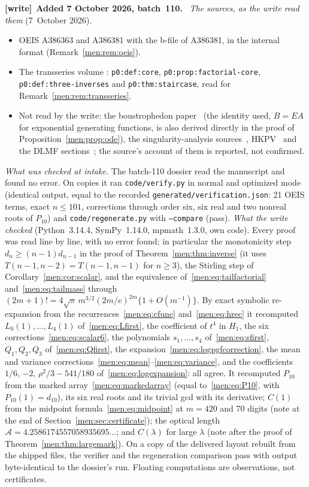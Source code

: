 \documentclass[11pt,letterpaper]{article}
\theoremstyle{remark}\newtheorem{remark}[theorem]{Remark}
\newcommand{\file}[1]{\nolinkurl{#1}}
\newenvironment{writenote}[1][]{\par\smallskip\begingroup\small
 \noindent\textbf{[write]}\if\relax\detokenize{#1}\relax\else~\textbf{#1.}\fi\ }%
 {\par\endgroup\smallskip}
\begin{document}
\begin{writenote}[Added 7 October 2026, batch~110]
\emph{The sources, as the write read them} (7~October 2026).
\begin{itemize}\raggedright
\item OEIS A386363 and A386381 with the b-file of A386381, in the internal
 format (Remark~\ref{men:rem:oeis}).
\item The transseries volume
 :
 \file{p0:def:core}, \file{p0:prop:factorial-core},
 \file{p0:def:three-inverses} and \file{p0:thm:staircase}, read for
 Remark~\ref{men:rem:transseries}.
\item Not read by the write: the boustrophedon paper~\cite{msy} (the
 identity used, $B=EA$ for exponential generating functions, is also
 derived directly in the proof of Proposition~\ref{men:prop:ode}), the
 singularity-analysis sources~\cite{fo,fs}, HKPV~\cite{hkpv} and the DLMF
 sections~\cite{dlmf}; the source's account of them is reported, not
 confirmed.
\end{itemize}

\emph{What was checked at intake.} The batch-110 dossier read the
manuscript and found no error. On copies it ran \file{code/verify.py} in
normal and optimized mode (identical output, equal to the recorded
\file{generated/verification.json}: 21 OEIS terms, exact $n\le101$,
corrections through order six, six real and two nonreal roots of
$P_{10}$) and \file{code/regenerate.py} with \texttt{--compare} (pass).
\emph{What the write checked} (Python~3.14.4, SymPy~1.14.0,
mpmath~1.3.0, own code). Every proof was read line by line, with no error
found; in particular the monotonicity step $d_n\ge(n-1)d_{n-1}$ in the
proof of Theorem~\ref{men:thm:inverse} (it uses $T(n-1,n-2)=T(n-1,n-1)$
for $n\ge3$), the Stirling step of Corollary~\ref{men:cor:scalar}, and the
equivalence of~\eqref{men:eq:tailfactorial} and~\eqref{men:eq:tailmass}
through $(2m+1)!=4\sqrt\pi\,m^{3/2}(2m/e)^{2m}\{1+O(m^{-1})\}$. By exact
symbolic re-expansion from the recurrences~\eqref{men:eq:cfunc}
and~\eqref{men:eq:hrec} it recomputed $L_0(1),\dots,L_4(1)$
of~\eqref{men:eq:Lfirst}, the coefficient of $t^4$ in $H_1$, the six
corrections~\eqref{men:eq:scalar6}, the polynomials $s_1,\dots,s_4$
of~\eqref{men:eq:sfirst}, $Q_1,Q_2,Q_3$ of~\eqref{men:eq:Qfirst}, the
expansion~\eqref{men:eq:logpgfcorrection}, the mean and variance
corrections~\eqref{men:eq:mean}--\eqref{men:eq:variance}, and the
coefficients $1/6$, $-2$, $\rho^2/3-541/180$ of~\eqref{men:eq:logexpansion}:
all agree. It recomputed $P_{10}$ from the marked
array~\eqref{men:eq:markedarray} (equal to~\eqref{men:eq:P10}, with
$P_{10}(1)=d_{10}$), its six real roots and its trivial gcd with its
derivative; $C(1)$ from the midpoint formula~\eqref{men:eq:midpoint} at
$m=420$ and 70 digits (note at the end of Section~\ref{men:sec:certificate});
the optical length $\mathcal A=4.2586174557058935695\ldots$; and $C(\lambda)$
for large $\lambda$ (note after the proof of Theorem~\ref{men:thm:largemark}).
On a copy of the delivered layout rebuilt from the shipped files, the
verifier and the regeneration comparison pass with output byte-identical to
the dossier's run. Floating computations are observations, not
certificates.


\end{writenote}
\end{document}
